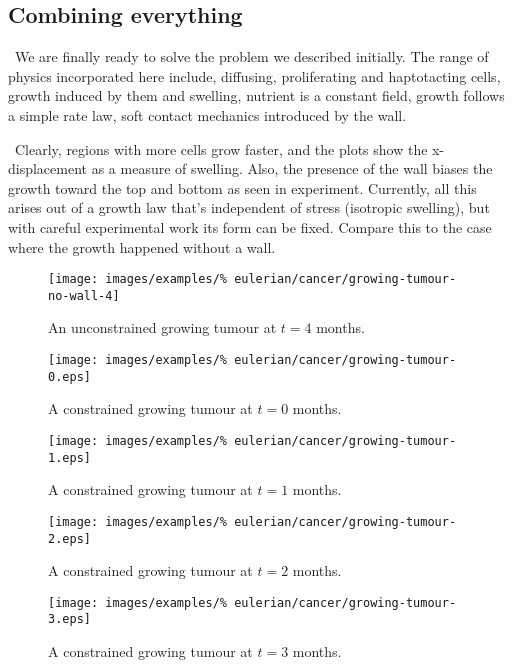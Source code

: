 \clearpage

\subsection{Combining everything}
\label{cacophonous-medley}

\textbullet\ We are finally ready to solve the problem we described
initially. The range of physics incorporated here include, diffusing,
proliferating and haptotacting cells, growth induced by them and
swelling, nutrient is a constant field, growth follows a simple rate
law, soft contact mechanics introduced by the wall.

\textbullet\ Clearly, regions with more cells grow faster, and the
plots show the x-displacement as a measure of swelling. Also, the
presence of the wall biases the growth toward the top and bottom as
seen in experiment. Currently, all this arises out of a growth law
that's independent of stress (isotropic swelling), but with careful
experimental work its form can be fixed. Compare this to the case
where the growth happened without a wall.

\begin{figure}[!hptb]
\centering
\texttt{[image: images/examples/\%
eulerian/cancer/growing-tumour-no-wall-4]}
\caption{An unconstrained growing tumour at $t=4$ months.}
\label{tumour-growth-no-wall-4}
\end{figure}

\begin{figure}[!hptb]
\centering
\texttt{[image: images/examples/\%
eulerian/cancer/growing-tumour-0.eps]}
\caption{A constrained growing tumour at $t=0$ months.}
\label{tumour-growth-constrained-0}
\end{figure}

\begin{figure}[!hptb]
\centering
\texttt{[image: images/examples/\%
eulerian/cancer/growing-tumour-1.eps]}
\caption{A constrained growing tumour at $t=1$ months.}
\label{tumour-growth-constrained-1}
\end{figure}

\begin{figure}[!hptb]
\centering
\texttt{[image: images/examples/\%
eulerian/cancer/growing-tumour-2.eps]}
\caption{A constrained growing tumour at $t=2$ months.}
\label{tumour-growth-constrained-2}
\end{figure}

\begin{figure}[!hptb]
\centering
\texttt{[image: images/examples/\%
eulerian/cancer/growing-tumour-3.eps]}
\caption{A constrained growing tumour at $t=3$ months.}
\label{tumour-growth-constrained-3}
\end{figure}

